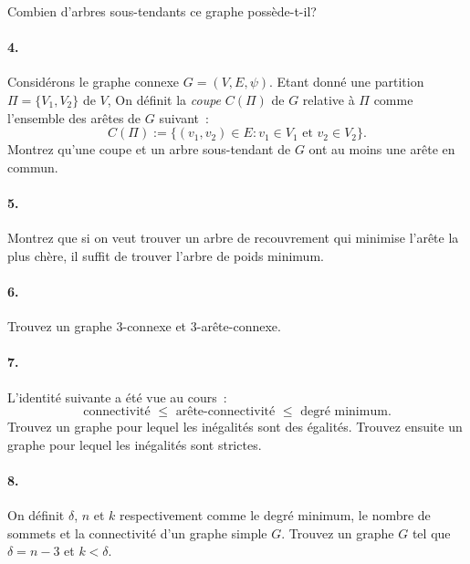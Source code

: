 Combien d'arbres sous-tendants ce graphe possède-t-il?

\paragraph{4. } Considérons le graphe connexe $G = (V, E, \psi)$. Etant donné une partition $\Pi = \{V_1, V_2\}$ de $V$, On définit la \emph{coupe} $C(\Pi)$ de $G$ relative à $\Pi$ comme l'ensemble des arêtes de $G$ suivant~:
\[
  C(\Pi) := \{ (v_1, v_2) \in E : v_1 \in V_1 \text{ et } v_2 \in V_2 \}.
\]
Montrez qu'une coupe et un arbre sous-tendant de $G$ ont au moins une arête en commun.

\paragraph{5. } Montrez que si on veut trouver un arbre de recouvrement qui minimise l'arête la plus chère, il suffit de trouver l'arbre de poids minimum.

\paragraph{6. } Trouvez un graphe 3-connexe et 3-arête-connexe.

\paragraph{7. } L'identité suivante a été vue au cours~:
\[
  \text{connectivité } \leq \text{ arête-connectivité } \leq \text{ degré minimum}.
\]
Trouvez un graphe pour lequel les inégalités sont des égalités. Trouvez ensuite un graphe pour lequel les inégalités sont strictes.

\paragraph{8. } On définit $\delta$, $n$ et $k$ respectivement comme le degré minimum, le nombre de sommets et la connectivité d'un graphe simple $G$. Trouvez un graphe $G$ tel que $\delta = n-3$ et $k < \delta$.
